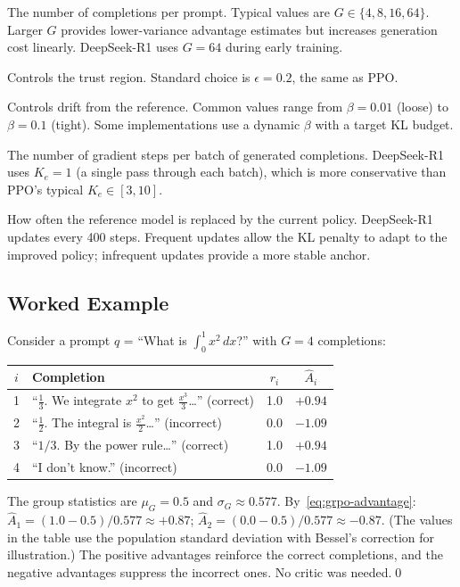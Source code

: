 \begin{description}[leftmargin=!,labelwidth=3.5cm]
  \item[Group size $G$] The number of completions per prompt.  Typical values are $G \in \{4, 8, 16, 64\}$.  Larger $G$ provides lower-variance advantage estimates but increases generation cost linearly.  DeepSeek-R1 uses $G = 64$ during early training.
  \item[Clip range $\epsilon$] Controls the trust region.  Standard choice is $\epsilon = 0.2$, the same as PPO.
  \item[KL coefficient $\beta$] Controls drift from the reference.  Common values range from $\beta = 0.01$ (loose) to $\beta = 0.1$ (tight).  Some implementations use a dynamic $\beta$ with a target KL budget.
  \item[Inner epochs $K_e$] The number of gradient steps per batch of generated completions.  DeepSeek-R1 uses $K_e = 1$ (a single pass through each batch), which is more conservative than PPO's typical $K_e \in [3, 10]$.
  \item[Reference update frequency $N_\mathrm{ref}$] How often the reference model is replaced by the current policy.  DeepSeek-R1 updates every 400 steps.  Frequent updates allow the KL penalty to adapt to the improved policy; infrequent updates provide a more stable anchor.
\end{description}

\subsection{Worked Example}

\begin{example}
\label{ex:grpo-advantage}
Consider a prompt $q$ = ``What is $\int_0^1 x^2\,dx$?'' with $G = 4$ completions:
\begin{center}
{\footnotesize
\begin{tabular}{@{}clcc@{}}
\toprule
$i$ & Completion & $r_i$ & $\hat{A}_i$ \\
\midrule
1 & ``$\frac{1}{3}$. We integrate $x^2$ to get $\frac{x^3}{3}$\ldots'' (correct) & 1.0 & $+0.94$ \\
2 & ``$\frac{1}{2}$. The integral is $\frac{x^2}{2}$\ldots'' (incorrect) & 0.0 & $-1.09$ \\
3 & ``$1/3$. By the power rule\ldots'' (correct) & 1.0 & $+0.94$ \\
4 & ``I don't know.'' (incorrect) & 0.0 & $-1.09$ \\
\bottomrule
\end{tabular}
}
\end{center}
The group statistics are $\mu_G = 0.5$ and $\sigma_G \approx 0.577$.  By~\eqref{eq:grpo-advantage}: $\hat{A}_1 = (1.0 - 0.5)/0.577 \approx +0.87$; $\hat{A}_2 = (0.0 - 0.5)/0.577 \approx -0.87$.  (The values in the table use the population standard deviation with Bessel's correction for illustration.)  The positive advantages reinforce the correct completions, and the negative advantages suppress the incorrect ones.  No critic was needed.\qed
\end{example}

